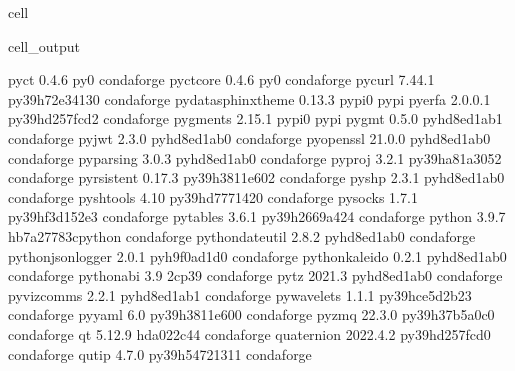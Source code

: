 \documentclass[letterpaper,table,10pt,english]{jupyterBook}
\begin{document}
\begin{sphinxuseclass}{cell}
\begin{sphinxVerbatimOutput}
\begin{sphinxuseclass}{cell_output}
\begin{sphinxVerbatim}[commandchars=\\\{\}]
pyct                      0.4.6                      py\PYGZus{}0    conda\PYGZhy{}forge
pyct\PYGZhy{}core                 0.4.6                      py\PYGZus{}0    conda\PYGZhy{}forge
pycurl                    7.44.1           py39h72e3413\PYGZus{}0    conda\PYGZhy{}forge
pydata\PYGZhy{}sphinx\PYGZhy{}theme       0.13.3                   pypi\PYGZus{}0    pypi
pyerfa                    2.0.0.1          py39hd257fcd\PYGZus{}2    conda\PYGZhy{}forge
pygments                  2.15.1                   pypi\PYGZus{}0    pypi
pygmt                     0.5.0              pyhd8ed1ab\PYGZus{}1    conda\PYGZhy{}forge
pyjwt                     2.3.0              pyhd8ed1ab\PYGZus{}0    conda\PYGZhy{}forge
pyopenssl                 21.0.0             pyhd8ed1ab\PYGZus{}0    conda\PYGZhy{}forge
pyparsing                 3.0.3              pyhd8ed1ab\PYGZus{}0    conda\PYGZhy{}forge
pyproj                    3.2.1            py39ha81a305\PYGZus{}2    conda\PYGZhy{}forge
pyrsistent                0.17.3           py39h3811e60\PYGZus{}2    conda\PYGZhy{}forge
pyshp                     2.3.1              pyhd8ed1ab\PYGZus{}0    conda\PYGZhy{}forge
pyshtools                 4.10             py39hd777142\PYGZus{}0    conda\PYGZhy{}forge
pysocks                   1.7.1            py39hf3d152e\PYGZus{}3    conda\PYGZhy{}forge
pytables                  3.6.1            py39h2669a42\PYGZus{}4    conda\PYGZhy{}forge
python                    3.9.7           hb7a2778\PYGZus{}3\PYGZus{}cpython    conda\PYGZhy{}forge
python\PYGZhy{}dateutil           2.8.2              pyhd8ed1ab\PYGZus{}0    conda\PYGZhy{}forge
python\PYGZhy{}json\PYGZhy{}logger        2.0.1              pyh9f0ad1d\PYGZus{}0    conda\PYGZhy{}forge
python\PYGZhy{}kaleido            0.2.1              pyhd8ed1ab\PYGZus{}0    conda\PYGZhy{}forge
python\PYGZus{}abi                3.9                      2\PYGZus{}cp39    conda\PYGZhy{}forge
pytz                      2021.3             pyhd8ed1ab\PYGZus{}0    conda\PYGZhy{}forge
pyviz\PYGZus{}comms               2.2.1              pyhd8ed1ab\PYGZus{}1    conda\PYGZhy{}forge
pywavelets                1.1.1            py39hce5d2b2\PYGZus{}3    conda\PYGZhy{}forge
pyyaml                    6.0              py39h3811e60\PYGZus{}0    conda\PYGZhy{}forge
pyzmq                     22.3.0           py39h37b5a0c\PYGZus{}0    conda\PYGZhy{}forge
qt                        5.12.9               hda022c4\PYGZus{}4    conda\PYGZhy{}forge
quaternion                2022.4.2         py39hd257fcd\PYGZus{}0    conda\PYGZhy{}forge
qutip                     4.7.0            py39h5472131\PYGZus{}1    conda\PYGZhy{}forge

\end{sphinxVerbatim}
\end{sphinxuseclass}
\end{sphinxVerbatimOutput}
\end{sphinxuseclass}
\end{document}
